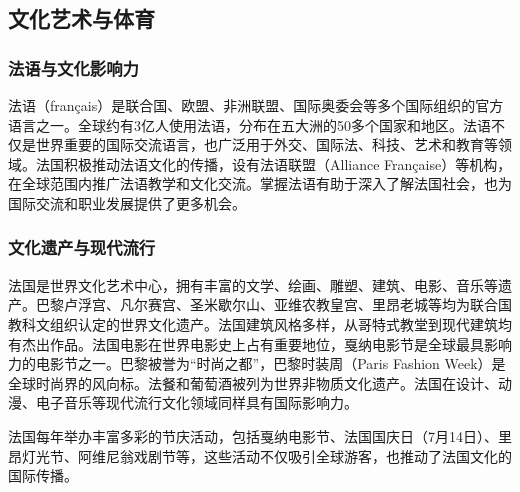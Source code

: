 \subsection{文化艺术与体育}

\subsubsection{法语与文化影响力}
法语（français）是联合国、欧盟、非洲联盟、国际奥委会等多个国际组织的官方语言之一。全球约有3亿人使用法语，分布在五大洲的50多个国家和地区。法语不仅是世界重要的国际交流语言，也广泛用于外交、国际法、科技、艺术和教育等领域。法国积极推动法语文化的传播，设有法语联盟（Alliance Française）等机构，在全球范围内推广法语教学和文化交流。掌握法语有助于深入了解法国社会，也为国际交流和职业发展提供了更多机会。

\subsubsection{文化遗产与现代流行}
法国是世界文化艺术中心，拥有丰富的文学、绘画、雕塑、建筑、电影、音乐等遗产。巴黎卢浮宫、凡尔赛宫、圣米歇尔山、亚维农教皇宫、里昂老城等均为联合国教科文组织认定的世界文化遗产。法国建筑风格多样，从哥特式教堂到现代建筑均有杰出作品。法国电影在世界电影史上占有重要地位，戛纳电影节是全球最具影响力的电影节之一。巴黎被誉为“时尚之都”，巴黎时装周（Paris Fashion Week）是全球时尚界的风向标。法餐和葡萄酒被列为世界非物质文化遗产。法国在设计、动漫、电子音乐等现代流行文化领域同样具有国际影响力。

法国每年举办丰富多彩的节庆活动，包括戛纳电影节、法国国庆日（7月14日）、里昂灯光节、阿维尼翁戏剧节等，这些活动不仅吸引全球游客，也推动了法国文化的国际传播。


